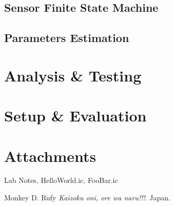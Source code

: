 \documentclass[a4paper, 11pt]{article}
\begin{document}
\subsection*{Sensor Finite State Machine}
\lipsum[2]

\subsection*{Parameters Estimation}
\lipsum[2]

\section*{Analysis \& Testing}
\lipsum[5]

\section*{Setup \& Evaluation}
\lipsum[6]

\section*{Attachments}
Lab Notes, HelloWorld.ic, FooBar.ic

\begin{thebibliography}{9}
 Monkey D. Rufy \emph{Kaizoku oni, ore wa naru!!!}. Japan.
\end{thebibliography}
\end{document}
